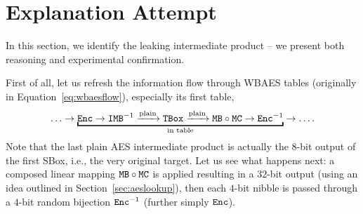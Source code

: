 \section{Explanation Attempt}
\label{sec:attempt}

In this section, we identify the leaking intermediate product -- we present both reasoning and experimental confirmation.

First of all, let us refresh the information flow through WBAES tables (originally in Equation~\ref{eq:wbaesflow}), especially its first table,
\begin{equation*}
	\ldots \rarr \underbracket{\Enc \rarr \IMB^{-1} \xrightarrow{\textnormal{plain}} \TBox \xrightarrow{\textnormal{plain}} \MB \circ \MC \rarr \Enc^{-1}}_{\textnormal{in table}} \rarr \ldots .
\end{equation*}
Note that the last plain AES intermediate product is actually the $8$-bit output of the first SBox, i.e., the very original target. Let us see what happens next: a composed linear mapping $\texttt{MB}\circ\texttt{MC}$ is applied resulting in a $32$-bit output (using an idea outlined in Section~\ref{sec:aeslookup}), then each $4$-bit nibble is passed through a $4$-bit random bijection $\texttt{Enc}^{-1}$ (further simply $\texttt{Enc}$).

